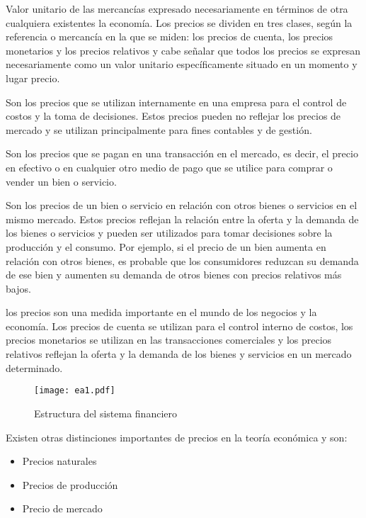 \begin{definition}[Precio]
    Valor unitario de las mercancías expresado necesariamente en términos de otra cualquiera existentes la economía. Los precios se dividen en tres clases, según la referencia o mercancía en la que se miden: los precios de cuenta, los precios monetarios y los precios relativos y cabe señalar que todos los precios se expresan necesariamente como un valor unitario específicamente situado en un momento y lugar precio.
\end{definition}
\begin{definition}
    Son los precios que se utilizan internamente en una empresa para el control de costos y la toma de decisiones. Estos precios pueden no reflejar los precios de mercado y se utilizan principalmente para fines contables y de gestión.
\end{definition}
\begin{definition}
    Son los precios que se pagan en una transacción en el mercado, es decir, el precio en efectivo o en cualquier otro medio de pago que se utilice para comprar o vender un bien o servicio.
\end{definition}
\begin{definition}
    Son los precios de un bien o servicio en relación con otros bienes o servicios en el mismo mercado. Estos precios reflejan la relación entre la oferta y la demanda de los bienes o servicios y pueden ser utilizados para tomar decisiones sobre la producción y el consumo. Por ejemplo, si el precio de un bien aumenta en relación con otros bienes, es probable que los consumidores reduzcan su demanda de ese bien y aumenten su demanda de otros bienes con precios relativos más bajos.
\end{definition}
los precios son una medida importante en el mundo de los negocios y la economía. Los precios de cuenta se utilizan para el control interno de costos, los precios monetarios se utilizan en las transacciones comerciales y los precios relativos reflejan la oferta y la demanda de los bienes y servicios en un mercado determinado.
\begin{figure}[h!]
\centering
  \texttt{[image: ea1.pdf]}
  \caption{Estructura del sistema financiero}
  \label{ea1}
\end{figure}
Existen otras distinciones importantes de precios en la teoría económica y son:
\begin{itemize}
    \item Precios naturales
    \item Precios de producción
    \item Precio de mercado
\end{itemize}
